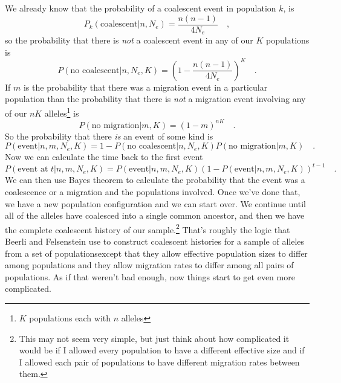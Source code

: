 We already know that the probability of a coalescent event in
population $k$, is
\[
P_k(\mbox{coalescent}|n, N_e) = \frac{n(n-1)}{4N_e} \quad ,
\]
so the probability that there is {\it not\/} a coalescent event in any
of our $K$ populations is
\[
P(\mbox{no coalescent}|n, N_e, K) = \left(1-\frac{n(n-1)}{4N_e}\right)^K
\quad .
\]
If $m$ is the probability that there was a migration event in a
particular population than the probability that there is {\it not\/} a
migration event involving any of our $nK$ alleles\footnote{$K$ populations
each with $n$ alleles} is
\[
P(\mbox{no migration}|m, K) = (1-m)^{nK} \quad .
\]
So the probability that there {\it is\/} an event of some kind is
\[
P(\mbox{event}|n, m, N_e, K) = 1 - P(\mbox{no coalescent}|n, N_e,
K)P(\mbox{no migration}|m, K) \quad .\label{eq:event}
\]
Now we can calculate the time back to the first event
\[
P(\mbox{event at }t|n, m, N_e, K) = P(\mbox{event}|n, m, N_e,
K)\left(1 - P(\mbox{event}|n, m, N_e, K)\right)^{t-1} \quad . \label{eq:time-to-event}
\]
We can then use Bayes theorem to calculate the probability that the
event was a coalescence or a migration and the populations
involved. Once we've done that, we have a new population configuration
and we can start over. We continue until all of the alleles have
coalesced into a single common ancestor, and then we have the complete
coalescent history of our sample.\footnote{This may not seem very
  simple, but just think about how complicated it would be if I
  allowed every population to have a different effective size and if I
  allowed each pair of populations to have different migration rates
  between them.} That's roughly the logic that Beerli and Felsenstein
use to construct coalescent histories for a sample of alleles from a
set of populations{\dash}except that they allow effective population
sizes to differ among populations and they allow migration rates to
differ among all pairs of populations. As if that weren't bad enough,
now things start to get even more complicated.

